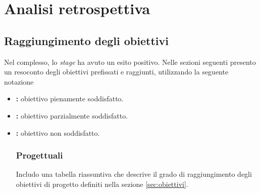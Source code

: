 
\chapter{Analisi retrospettiva}
	
\section{Raggiungimento degli obiettivi}
	Nel complesso, lo \textit{stage} ha avuto un esito positivo. Nelle sezioni seguenti presento un resoconto degli obiettivi prefissati e raggiunti, utilizzando la seguente notazione
	\begin{itemize}
		\item \textbf{\greencheck:} obiettivo pienamente soddisfatto.
		\item \textbf{\yellowcheck:} obiettivo parzialmente soddisfatto.
		\item \textbf{\redx:} obiettivo non soddisfatto.
		
	\subsection{Progettuali}
		Includo una tabella riassuntiva che descrive il grado di raggiungimento degli obiettivi di progetto definiti nella sezione \ref{sec:obiettivi}.
		\end{itemize}
		
